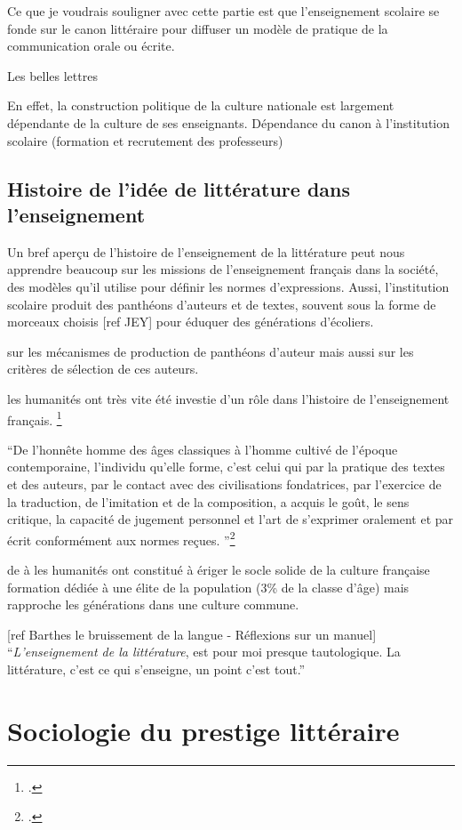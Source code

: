 Ce que je voudrais souligner avec cette partie est que l'enseignement scolaire se fonde sur le canon littéraire pour diffuser un modèle de pratique de la communication orale ou écrite. 

Les belles lettres

En effet, la construction politique de la culture nationale est largement dépendante de la culture de ses enseignants. Dépendance du canon à l'institution scolaire (formation et recrutement des professeurs)

\subsection{Histoire de l'idée de littérature dans l'enseignement}
Un bref aperçu de l'histoire de l'enseignement de la littérature peut nous apprendre beaucoup sur les missions de l'enseignement français dans la société, des modèles qu'il utilise pour définir les normes d'expressions. Aussi, l'institution scolaire produit des panthéons d'auteurs et de textes, souvent sous la forme de morceaux choisis [ref JEY] pour éduquer des générations d'écoliers.

sur les mécanismes de production de panthéons d'auteur mais aussi sur les critères de sélection de ces auteurs. 


les humanités ont très vite été investie d'un rôle dans l'histoire de l'enseignement français. 
\footcites{chervel_histoire_1993}

\enquote{De l'honnête homme des âges classiques à l'homme cultivé de l'époque contemporaine, l'individu qu'elle forme, c'est celui qui par la pratique des textes et des auteurs, par le contact avec des civilisations fondatrices, par l'exercice de la traduction, de l'imitation et de la composition, a acquis le goût, le sens critique, la capacité de jugement personnel et l'art de s'exprimer oralement et par écrit conformément aux normes reçues. }\footcites{compere_les_1997}

de à les humanités ont constitué à ériger le socle solide de la culture française formation dédiée à une élite de la population (3\% de la classe d'âge) mais rapproche les générations dans une culture commune. 

[ref Barthes le bruissement de la langue - Réflexions sur un manuel]
\enquote{\textit{L'enseignement de la littérature}, est pour moi presque tautologique. La littérature, c'est ce qui s'enseigne, un point c'est tout.}


\section{Sociologie du prestige littéraire}


